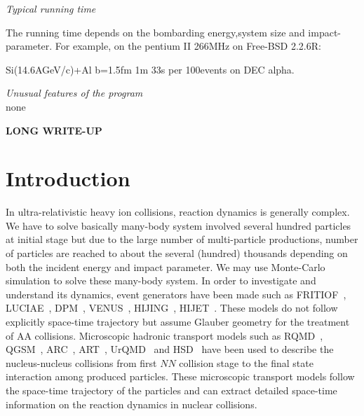 \documentclass[]{article}
\begin{document}
{\noindent\em Typical running time}

\noindent
 The running time depends on the bombarding energy,system size and
 impact-parameter.
For example, on the pentium II 266MHz on Free-BSD 2.2.6R:

Si(14.6AGeV/c)+Al b=1.5fm 1m 33s per 100events on DEC alpha.


{\noindent\em Unusual features of the program}\\
\noindent none


\bigskip
\begin{flushleft}
{\large \bf LONG WRITE-UP}\\
\end{flushleft}


\section{Introduction}

In ultra-relativistic heavy ion collisions,
 reaction dynamics is generally complex.
We have to solve basically many-body system involved several
  hundred particles at initial stage
  but due to the large number of multi-particle productions,
  number of particles are reached to about the several (hundred) thousands
 depending on both the incident energy and impact parameter.
We may use Monte-Carlo simulation to solve these many-body system.
In order to investigate and understand its dynamics,
  event generators have been made such as
 FRITIOF~\cite{fritiof}, LUCIAE~\cite{luciae},
 DPM~\cite{dpm}, VENUS~\cite{venus},
 HIJING~\cite{hijing}, HIJET~\cite{hijet}.
These models do not follow explicitly space-time trajectory but
assume Glauber geometry for the treatment of AA collisions.
Microscopic hadronic transport models such as
  RQMD~\cite{rqmd1,rqmd2}, QGSM~\cite{qgsm}, ARC~\cite{arc},
  ART~\cite{art}, UrQMD~\cite{urqmd} and HSD~\cite{hsd}
  have been used to describe the nucleus-nucleus collisions
  from first $NN$ collision stage
  to the final state interaction among produced particles.
These microscopic transport models follow the space-time trajectory
  of the particles and can extract detailed space-time information
  on the reaction dynamics in nuclear collisions.
\end{document}
